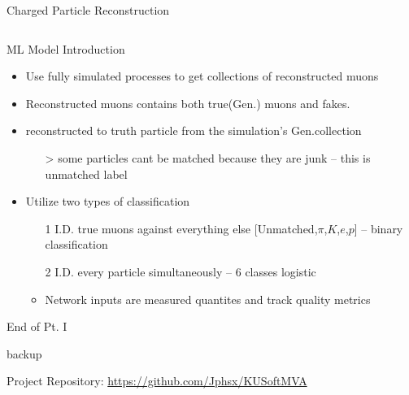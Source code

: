 \documentclass[10pt,handout]{beamer}
\begin{document}
\begin{frame}{Charged Particle Reconstruction}
\begin{columns}
\begin{column}{0.5\textwidth}
\end{column}
\end{columns}



\end{frame}

\begin{frame}{ML Model Introduction}
\begin{itemize}
\item Use fully simulated processes to get collections of reconstructed muons\\

\item Reconstructed muons contains both true(Gen.) muons and fakes.\\

\item reconstructed to truth particle from the simulation's Gen.collection\\
\begin{itemize}
\item[>] some particles cant be matched because they are junk -- this is unmatched label
\end{itemize}

\item Utilize two types of classification\\ 
\begin{itemize}
\item[1] I.D. true muons against everything else [Unmatched,$\pi$,$K$,$e$,$p$] -- binary classification\\

\item[2] I.D. every particle simultaneously -- 6 classes logistic
\item Network inputs are measured quantites and track quality metrics
\end{itemize}
\end{itemize}
\end{frame}

\begin{frame}
End of Pt. I
\end{frame}

\begin{frame}{backup}
\end{frame}


\begin{frame}
Project Repository: \url{https://github.com/Jphsx/KUSoftMVA}
\end{frame}
\end{document}
